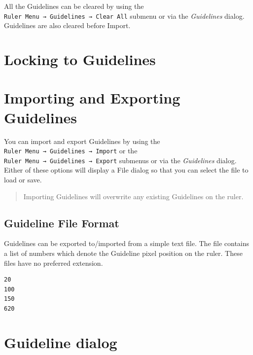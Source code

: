 \documentclass[
]{book}
\begin{document}
All the Guidelines can be cleared by using the \texttt{Ruler\ Menu\ →\ Guidelines\ →\ Clear\ All} submenu or via the \emph{Guidelines} dialog.
Guidelines are also cleared before Import.

\hypertarget{locking-to-guidelines}{%
\section{Locking to Guidelines}\label{locking-to-guidelines}}

\hypertarget{importing-and-exporting-guidelines}{%
\section{Importing and Exporting Guidelines}\label{importing-and-exporting-guidelines}}

You can import and export Guidelines by using the \texttt{Ruler\ Menu\ →\ Guidelines\ →\ Import} or the \texttt{Ruler\ Menu\ →\ Guidelines\ →\ Export} submenus or via the \emph{Guidelines} dialog.
Either of these options will display a File dialog so that you can select the file to load or save.

\begin{quote}
Importing Guidelines will overwrite any existing Guidelines on the ruler.
\end{quote}

\hypertarget{guideline-file-format}{%
\subsection{Guideline File Format}\label{guideline-file-format}}

Guidelines can be exported to/imported from a simple text file.
The file contains a list of numbers which denote the Guideline pixel position on the ruler.
These files have no preferred extension.

\begin{verbatim}
20
100
150
620
\end{verbatim}

\hypertarget{guideline-dialog}{%
\section{Guideline dialog}\label{guideline-dialog}}
\end{document}
